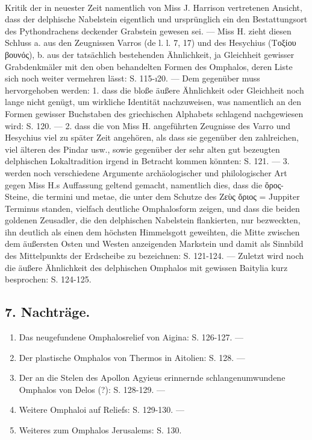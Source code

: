 \documentclass[a4paper, 11pt, oneside]{article}
\begin{document}
\paragraph{}
Kritik der in neuester Zeit namentlich von Miss J. Harrison vertretenen Ansicht, dass der delphische Nabelstein eigentlich und ursprünglich ein den Bestattungsort des Pythondrachens deckender Grabstein gewesen sei. --- Miss H. zieht diesen Schluss a. aus den Zeugnissen Varros (de l. l. 7, 17) und des Hesychius (Τοξίου βουνός), b. aus der tatsächlich bestehenden Ähnlichkeit, ja Gleichheit gewisser Grabdenkmäler mit den oben behandelten Formen des Omphalos, deren Liste sich noch weiter vermehren lässt: S. 115-ı20. --- Dem gegenüber muss hervorgehoben werden: 1. dass die bloße äußere Ähnlichkeit oder Gleichheit noch lange nicht genügt, um wirkliche Identität nachzuweisen, was namentlich an den Formen gewisser Buchstaben des griechischen Alphabets schlagend nachgewiesen wird: S. 120. --- 2. dass die von Miss H. angeführten Zeugnisse des Varro und Hesychius viel zu später Zeit angehören, als dass sie gegenüber den zahlreichen, viel älteren des Pindar usw., sowie gegenüber der sehr alten gut bezeugten delphischen Lokaltradition irgend in Betracht kommen könnten: S. 121. --- 3. werden noch verschiedene Argumente archäologischer und philologischer Art gegen Miss H.s Auffassung geltend gemacht, namentlich dies, dass die ὅρος-Steine, die termini und metae, die unter dem Schutze des Ζεὺς ὅριος = Juppiter Terminus standen, vielfach deutliche Omphalosform zeigen, und dass die beiden goldenen Zeusadler, die den delphischen Nabelstein flankierten, nur bezweckten, ihn deutlich als einen dem höchsten Himmelsgott geweihten, die Mitte zwischen dem äußersten Osten und Westen anzeigenden Markstein und damit als Sinnbild des Mittelpunkts der Erdscheibe zu bezeichnen: S. 121-124. --- Zuletzt wird noch die äußere Ähnlichkeit des delphischen Omphalos mit gewissen Baitylia kurz besprochen: S. 124-125.

\subsection*{7. Nachträge.}
\begin{enumerate}
    \item Das neugefundene Omphalosrelief von Aigina: S. 126-127. ---
    \item Der plastische Omphalos von Thermos in Aitolien: S. 128. ---
    \item Der an die Stelen des Apollon Agyieus erinnernde schlangenumwundene Omphalos von Delos (?): S. 128-129. ---
    \item Weitere Omphaloi auf Reliefs: S. 129-130. ---
    \item Weiteres zum Omphalos Jerusalems: S. 130.
\end{enumerate}
\end{document}
